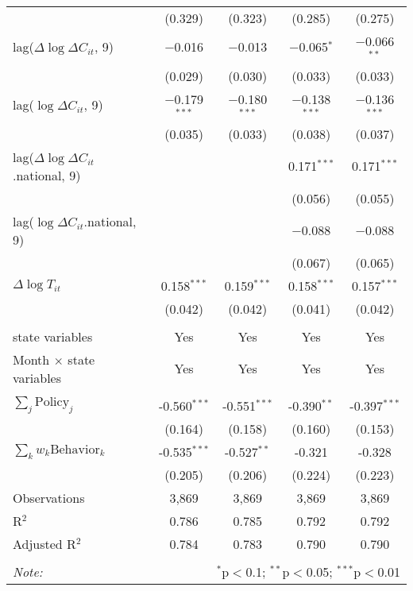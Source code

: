 \begin{tabular}{@{\extracolsep{1pt}}lcccc}
  & (0.329) & (0.323) & (0.285) & (0.275) \\ 
  lag($\Delta \log \Delta C_{it}$, 9) & $-$0.016 & $-$0.013 & $-$0.065$^{*}$ & $-$0.066$^{**}$ \\ 
  & (0.029) & (0.030) & (0.033) & (0.033) \\ 
  lag($\log \Delta C_{it}$, 9) & $-$0.179$^{***}$ & $-$0.180$^{***}$ & $-$0.138$^{***}$ & $-$0.136$^{***}$ \\ 
  & (0.035) & (0.033) & (0.038) & (0.037) \\ 
  lag($\Delta \log \Delta C_{it}$.national, 9) &  &  & 0.171$^{***}$ & 0.171$^{***}$ \\ 
  &  &  & (0.056) & (0.055) \\ 
  lag($\log \Delta C_{it}$.national, 9) &  &  & $-$0.088 & $-$0.088 \\ 
  &  &  & (0.067) & (0.065) \\ 
  $\Delta \log T_{it}$ & 0.158$^{***}$ & 0.159$^{***}$ & 0.158$^{***}$ & 0.157$^{***}$ \\ 
  & (0.042) & (0.042) & (0.041) & (0.042) \\ 
 \hline \\[-1.8ex] 
state variables & Yes & Yes & Yes & Yes \\ 
Month $\times$ state variables & Yes & Yes & Yes & Yes \\ 
\hline \\[-1.8ex] 
$\sum_j \mathrm{Policy}_j$ & -0.560$^{***}$ & -0.551$^{***}$ & -0.390$^{**}$ & -0.397$^{***}$ \\ 
 & (0.164) & (0.158) & (0.160) & (0.153) \\ 
$\sum_k w_k \mathrm{Behavior}_k$ & -0.535$^{***}$ & -0.527$^{**}$ & -0.321 & -0.328 \\ 
 & (0.205) & (0.206) & (0.224) & (0.223) \\ 
Observations & 3,869 & 3,869 & 3,869 & 3,869 \\ 
R$^{2}$ & 0.786 & 0.785 & 0.792 & 0.792 \\ 
Adjusted R$^{2}$ & 0.784 & 0.783 & 0.790 & 0.790 \\ 
\hline 
\hline \\[-1.8ex] 
\textit{Note:}  & \multicolumn{4}{r}{$^{*}$p$<$0.1; $^{**}$p$<$0.05; $^{***}$p$<$0.01} \\ 
\end{tabular} 